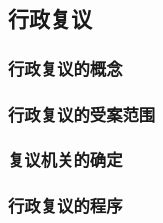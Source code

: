 \subsection{行政复议}

\subsubsection{行政复议的概念}

\subsubsection{行政复议的受案范围}

\subsubsection{复议机关的确定}

\subsubsection{行政复议的程序}